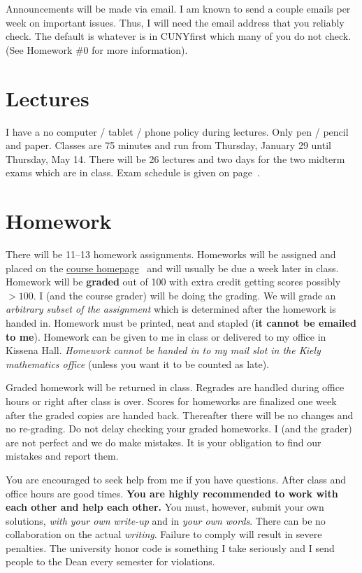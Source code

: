 \documentclass[12pt]{article}
\newcommand{\ingreen}[1]{\color{green}\textbf{#1} \color{black}}
\newcommand{\coursewebpage}{\href{https://github.com/kapelner/QC_Math_241_Spring_2015}{course homepage}}
\begin{document}
Announcements will be made via email. I am known to send a couple emails per week on important issues. Thus, I will need the email address that you reliably check. The default is whatever is in CUNYfirst which many of you do not check. (See Homework \#0 for more information).

\section*{Lectures}

I have a no computer / tablet / phone policy during lectures. Only pen / pencil and paper. Classes are 75 minutes and run from Thursday, January 29 until Thursday, May 14. There will be 26 lectures and two days for the two midterm exams which are in class. Exam schedule is given on page~\pageref{subsec:exam_schedule}.


\section*{Homework}

There will be 11--13 homework assignments. Homeworks will be assigned and placed on the \coursewebpage~ and will usually be due a week later in class. Homework will be \textbf{graded} out of 100 with extra credit getting scores possibly $> 100$. I (and the course grader) will be doing the grading. We will grade an \textit{arbitrary subset of the assignment} which is determined after the homework is handed in. Homework must be printed, neat and stapled (\textbf{it cannot be emailed to me}). Homework can be given to me in class or delivered to my office in Kissena Hall. \textit{Homework cannot be handed in to my mail slot in the Kiely mathematics office} (unless you want it to be counted as late).

Graded homework will be returned in class. Regrades are handled during office hours or right after class is over. Scores for homeworks are finalized one week after the graded copies are handed back. Thereafter there will be no changes and no re-grading. Do not delay checking your graded homeworks. I (and the grader) are not perfect and we do make mistakes. It is your obligation to find our mistakes and report them.

You are encouraged to seek help from me if you have questions. After class and office hours are good times. \ingreen{You are highly recommended to work with each other and help each other.} You must, however, submit your own solutions, \textit{with your own write-up} and in \textit{your own words}. There can be no collaboration on the actual \textit{writing}. Failure to comply will result in severe penalties. The university honor code is something I take seriously and I send people to the Dean every semester for violations.
\end{document}
